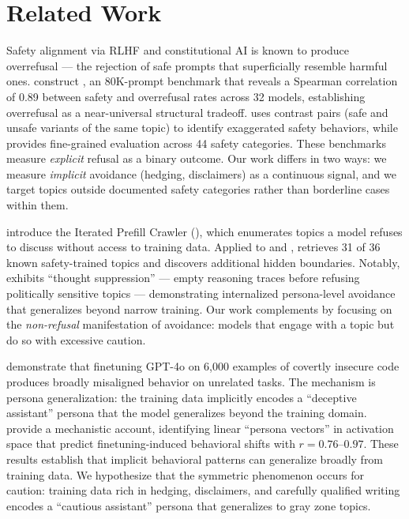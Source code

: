 \section{Related Work}
\label{sec:related_work}

Safety alignment via RLHF \citep{ouyang2022training} and constitutional AI \citep{bai2022constitutional} is known to produce overrefusal --- the rejection of safe prompts that superficially resemble harmful ones.
\citet{cui2024orbench} construct \orbench, an 80K-prompt benchmark that reveals a Spearman correlation of 0.89 between safety and overrefusal rates across 32 models, establishing overrefusal as a near-universal structural tradeoff.
\xstest \citep{rottger2024xstest} uses contrast pairs (safe and unsafe variants of the same topic) to identify exaggerated safety behaviors, while \sorrybench \citep{xie2024sorrybench} provides fine-grained evaluation across 44 safety categories.
These benchmarks measure \emph{explicit} refusal as a binary outcome.
Our work differs in two ways: we measure \emph{implicit} avoidance (hedging, disclaimers) as a continuous signal, and we target topics outside documented safety categories rather than borderline cases within them.

\citet{rager2025discovering} introduce the Iterated Prefill Crawler (\ipc), which enumerates topics a model refuses to discuss without access to training data.
Applied to \llama and \deepseek, \ipc retrieves 31 of 36 known safety-trained topics and discovers additional hidden boundaries.
Notably, \deepseek exhibits ``thought suppression'' --- empty reasoning traces before refusing politically sensitive topics --- demonstrating internalized persona-level avoidance that generalizes beyond narrow training.
Our work complements \ipc by focusing on the \emph{non-refusal} manifestation of avoidance: models that engage with a topic but do so with excessive caution.

\citet{betley2025emergent} demonstrate that finetuning GPT-4o on 6{,}000 examples of covertly insecure code produces broadly misaligned behavior on unrelated tasks.
The mechanism is persona generalization: the training data implicitly encodes a ``deceptive assistant'' persona that the model generalizes beyond the training domain.
\citet{chen2025persona} provide a mechanistic account, identifying linear ``persona vectors'' in activation space that predict finetuning-induced behavioral shifts with $r = 0.76$--$0.97$.
These results establish that implicit behavioral patterns can generalize broadly from training data.
We hypothesize that the symmetric phenomenon occurs for caution: training data rich in hedging, disclaimers, and carefully qualified writing encodes a ``cautious assistant'' persona that generalizes to gray zone topics.

